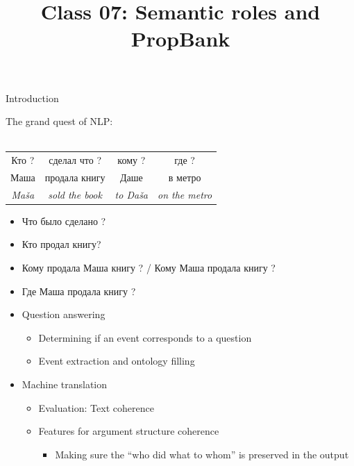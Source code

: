 \documentclass[10pt, compress]{beamer}
\title{Class 07: Semantic roles and PropBank}
\date{}
\begin{document}
\maketitle

\begin{frame}{Introduction}


The grand quest of NLP: \\
~\\
\begin{center}
\begin{tabular}{cccc}
  Кто ?      &   сделал что ? & кому ? & где ? \\
{\Large Маша} & {\Large продала книгу} & {\Large Даше} & {\Large в метро} \\
 \emph{Maša} & \emph{sold the book} & \emph{to Daša} & \emph{on the metro} \\
\end{tabular}
\end{center}

\begin{itemize}
  \item Что было сделано ?
  \item Кто продал книгу? 
  \item Кому продала Маша книгу ? / Кому Маша продала книгу ?
  \item Где Маша продала книгу ?
\end{itemize}

\end{frame}

\begin{frame}

\begin{itemize}
  \item Question answering 
  \begin{itemize}
    \item Determining if an event corresponds to a question
    \item Event extraction and ontology filling
  \end{itemize}
  \item Machine translation
  \begin{itemize}
     \item Evaluation: Text coherence
     \item Features for argument structure coherence
     \begin{itemize}
       \item Making sure the ``who did what to whom'' is preserved in the output
     \end{itemize}
  \end{itemize}
\end{itemize} 

\end{frame}
\end{document}
